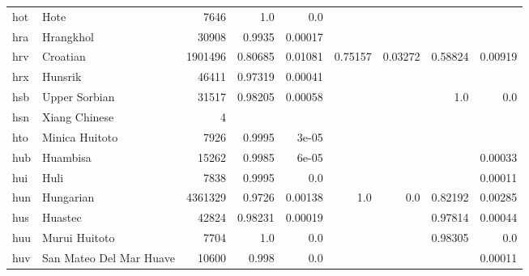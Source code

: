 \documentclass[11pt]{article}
\begin{document}
\begin{table*}[h]
{\begin{tabular}{llrrrrrrr}
hot         & Hote         & 7646         & 1.0         & 0.0         &          &          &          &          \\

hra         & Hrangkhol         & 30908         & 0.9935         & 0.00017         &          &          &          &          \\

hrv         & Croatian         & 1901496         & 0.80685         & 0.01081         & 0.75157         & 0.03272         & 0.58824         & 0.00919         \\

hrx         & Hunsrik         & 46411         & 0.97319         & 0.00041         &          &          &          &          \\

hsb         & Upper Sorbian         & 31517         & 0.98205         & 0.00058         &          &          & 1.0         & 0.0         \\

hsn         & Xiang Chinese         & 4         &          &          &          &          &          &          \\

hto         & Minica Huitoto         & 7926         & 0.9995         & 3e-05         &          &          &          &          \\

hub         & Huambisa         & 15262         & 0.9985         & 6e-05         &          &          &          & 0.00033         \\

hui         & Huli         & 7838         & 0.9995         & 0.0         &          &          &          & 0.00011         \\

hun         & Hungarian         & 4361329         & 0.9726         & 0.00138         & 1.0         & 0.0         & 0.82192         & 0.00285         \\

hus         & Huastec         & 42824         & 0.98231         & 0.00019         &          &          & 0.97814         & 0.00044         \\

huu         & Murui Huitoto         & 7704         & 1.0         & 0.0         &          &          & 0.98305         & 0.0         \\

huv         & San Mateo Del Mar Huave         & 10600         & 0.998         & 0.0         &          &          &          & 0.00011         \\


\end{tabular}}
\end{table*}
\end{document}
